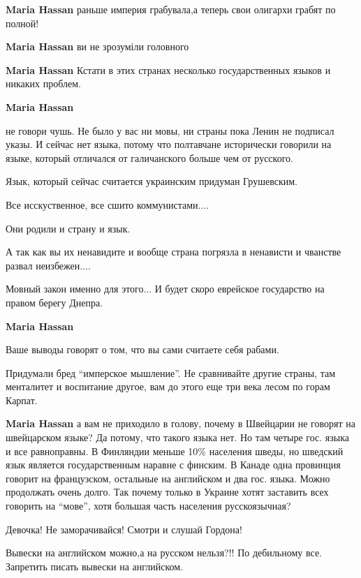 \begin{itemize}
\begin{itemize}
\textbf{Maria Hassan} раньше империя грабувала,а теперь свои олигархи грабят по полной!

\textbf{Maria Hassan} ви не зрозуміли головного

\textbf{Maria Hassan} Кстати в этих странах несколько государственных языков и никаких проблем.

\textbf{Maria Hassan} 

не говори чушь. Не было у вас ни мовы, ни страны пока Ленин не подписал указы.
И сейчас нет языка, потому что полтавчане исторически говорили на языке,
который отличался от галичанского больше чем от русского.

Язык, который сейчас считается украинским придуман Грушевским.

Все исскуственное, все сшито коммунистами....

Они родили и страну и язык.

А так как вы их ненавидите и вообще страна погрязла в ненависти и чванстве развал неизбежен....

Мовный закон именно для этого... И будет скоро еврейское государство на правом берегу Днепра.


\textbf{Maria Hassan} 

Ваше выводы говорят о том, что вы сами считаете себя рабами.

Придумали бред \enquote{имперское мышление}. Не сравнивайте другие страны, там
менталитет и воспитание другое, вам до этого еще три века лесом по горам
Карпат.


\textbf{Maria Hassan} а вам не приходило в голову, почему в Швейцарии не
говорят на швейцарском языке? Да потому, что такого языка нет. Но там четыре
гос. языка и все равноправны. В Финляндии меньше 10\% населения шведы, но
шведский язык является государственным наравне с финским. В Канаде одна
провинция говорит на французском, остальные на английском и два гос. языка.
Можно продолжать очень долго. Так почему только в Украине хотят заставить всех
говорить на \enquote{мове}, хотя большая часть населения русскоязычная?
\end{itemize}

Девочка! Не заморачивайся! Смотри и слушай Гордона!

Вывески на английском можно,а на русском нельзя?!! По дебильному все. Запретить писать вывески на английском.


\end{itemize}
